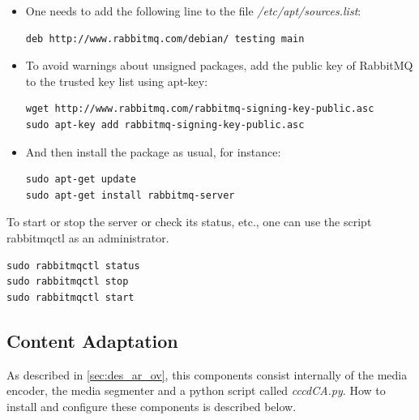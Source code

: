 \begin{itemize}

\item One needs to add the following line to the file \textit{/etc/apt/sources.list}:

\begin{code}
\begin{verbatim}
deb http://www.rabbitmq.com/debian/ testing main
\end{verbatim}
\end{code}

\item To avoid warnings about unsigned packages, add the public key of RabbitMQ to the trusted key list using apt-key:

\begin{code}
\begin{verbatim}
wget http://www.rabbitmq.com/rabbitmq-signing-key-public.asc
sudo apt-key add rabbitmq-signing-key-public.asc
\end{verbatim}
\end{code}

\item And then install the package as usual, for instance:

\begin{code}
\begin{verbatim}
sudo apt-get update
sudo apt-get install rabbitmq-server
\end{verbatim}
\end{code}

\end{itemize} 

To start or stop the server or check its status, etc., one can use the script rabbitmqctl as an administrator. 
\begin{code}
\begin{verbatim}
sudo rabbitmqctl status
sudo rabbitmqctl stop
sudo rabbitmqctl start
\end{verbatim}
\end{code}

\subsection{Content Adaptation\label{sec:eval_te_ca}}
As described in \ref{sec:des_ar_ov}, this components consist internally of the media encoder, the media segmenter and a python script called \textit{cccdCA.py}. How to install and configure these components is described below.  

